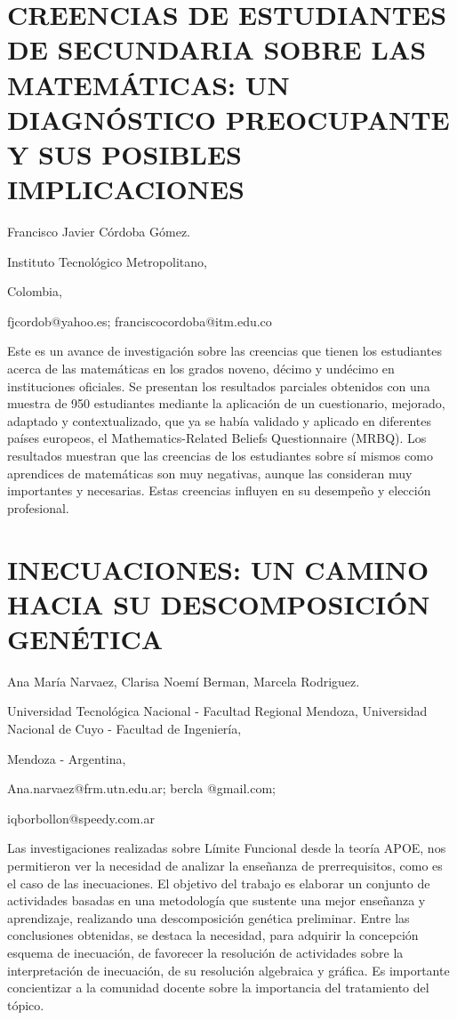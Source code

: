 \section{CREENCIAS DE ESTUDIANTES DE SECUNDARIA SOBRE LAS MATEMÁTICAS: UN
DIAGNÓSTICO PREOCUPANTE Y SUS POSIBLES IMPLICACIONES }

\begin{datos}

Francisco Javier Córdoba Gómez.

Instituto Tecnológico Metropolitano,

Colombia,

fjcordob@yahoo.es; franciscocordoba@itm.edu.co 

\end{datos}

Este es un avance de investigación sobre las creencias que tienen
los estudiantes acerca de las matemáticas en los grados noveno, décimo
y undécimo en instituciones oficiales. Se presentan los resultados
parciales obtenidos con una muestra de 950 estudiantes mediante la
aplicación de un cuestionario, mejorado, adaptado y contextualizado,
que ya se había validado y aplicado en diferentes países europeos,
el Mathematics-Related Beliefs Questionnaire (MRBQ). Los resultados
muestran que las creencias de los estudiantes sobre sí mismos como
aprendices de matemáticas son muy negativas, aunque las consideran
muy importantes y necesarias. Estas creencias influyen en su desempeño
y elección profesional.


\section{INECUACIONES: UN CAMINO HACIA SU DESCOMPOSICIÓN GENÉTICA}

\begin{datos}

Ana María Narvaez, Clarisa Noemí Berman, Marcela Rodriguez.

Universidad Tecnológica Nacional - Facultad Regional Mendoza, Universidad
Nacional de Cuyo - Facultad de Ingeniería,

Mendoza - Argentina,

Ana.narvaez@frm.utn.edu.ar; bercla @gmail.com; 

iqborbollon@speedy.com.ar

\end{datos}

Las investigaciones realizadas sobre Límite Funcional desde la teoría
APOE, nos permitieron ver la necesidad de analizar la enseñanza de
prerrequisitos, como es el caso de las inecuaciones. El objetivo del
trabajo es elaborar un conjunto de actividades basadas en una metodología
que sustente una mejor enseñanza y aprendizaje, realizando una descomposición
genética preliminar. Entre las conclusiones obtenidas, se destaca
la necesidad, para adquirir la concepción esquema de inecuación, de
favorecer la resolución de actividades sobre la interpretación de
inecuación, de su resolución algebraica y gráfica. Es importante concientizar
a la comunidad docente sobre la importancia del tratamiento del tópico. 


